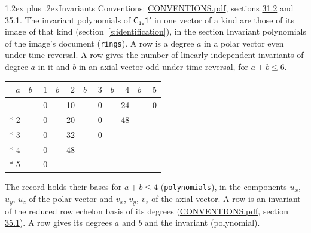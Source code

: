 \documentclass[10pt,a4paper]{article}
\makeatletter
\renewcommand\section{\@startsection{section}{1}{\z@}{-3ex plus -1ex minus -.2ex}%
  {1.2ex plus .2ex}{\normalfont\large\sffamily\bfseries\color{parttitle}}}
\numberwithin{equation}{section}
\newcommand{\grp}[1]{\mathsf{#1}}
\makeatother
\begin{document}
\section{Invariants}\label{s:invariants}
Conventions: \href{../../CONVENTIONS.pdf}{CONVENTIONS.pdf}, sections \href{../../CONVENTIONS.pdf\#conv.31.2}{31.2} and \href{../../CONVENTIONS.pdf\#conv.35.1}{35.1}.
The invariant polynomials of $\grp{C_{1v}1'}$ in one vector of a kind are those of its image of that kind (section~\ref{s:identification}), in the section Invariant polynomials of the image's document (\texttt{rings}).
\leavevmode\label{n:index.degree.polar}\label{n:index.degree.axial}A row is a degree $a$ in a polar vector even under time reversal. A row gives the number of linearly independent invariants of degree $a$ in it and $b$ in an axial vector odd under time reversal, for $a + b \le 6$.
{\small\begin{longtable}{@{}rrrrrr@{}}\toprule
$a$ & $b = 1$ & $b = 2$ & $b = 3$ & $b = 4$ & $b = 5$\\\midrule\endhead
\bottomrule\endfoot\endlastfoot
1 & 0 & 10 & 0 & 24 & 0\\*
2 & 0 & 20 & 0 & 48 & \\*
3 & 0 & 32 & 0 &  & \\*
4 & 0 & 48 &  &  & \\*
5 & 0 &  &  &  & \\
\bottomrule\end{longtable}}
\leavevmode\label{n:local.component.polar}\label{n:local.component.axial}The record holds their bases for $a + b \le 4$ (\texttt{polynomials}), in the components $u_{x}$, $u_{y}$, $u_{z}$ of the polar vector and $v_{x}$, $v_{y}$, $v_{z}$ of the axial vector. \label{n:head.polynomial}A row is an invariant of the reduced row echelon basis of its degrees (\href{../../CONVENTIONS.pdf}{CONVENTIONS.pdf}, section \href{../../CONVENTIONS.pdf\#conv.35.1}{35.1}). A row gives its degrees $a$ and $b$ and the invariant (polynomial).
\end{document}

